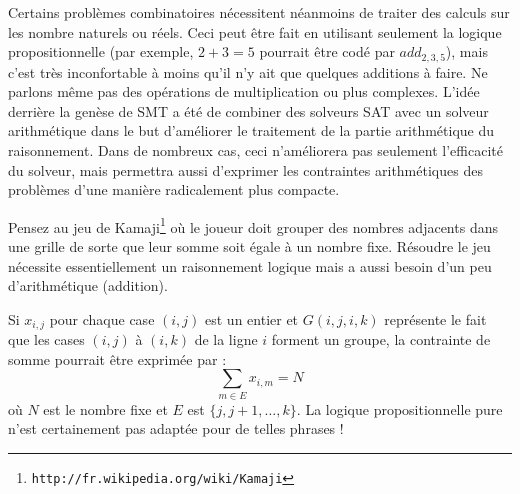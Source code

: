 
Certains problèmes combinatoires nécessitent néanmoins de traiter des calculs sur les nombre naturels ou réels. Ceci peut être fait en utilisant seulement la logique propositionnelle (par exemple, $2+3=5$ pourrait être codé par $add_{2,3,5}$), mais c'est très inconfortable à moins qu'il n'y ait que quelques additions à faire. Ne parlons même pas des opérations de multiplication ou plus complexes. L'idée derrière la genèse de SMT a été de combiner des solveurs SAT avec un solveur arithmétique dans le but d'améliorer le traitement de la partie arithmétique du raisonnement. Dans de nombreux cas, ceci n'améliorera pas seulement l'efficacité du solveur, mais permettra aussi d'exprimer les contraintes arithmétiques des problèmes d'une manière radicalement plus compacte.

Pensez au jeu de Kamaji\footnote{\texttt{http://fr.wikipedia.org/wiki/Kamaji}}  où le joueur doit grouper des nombres adjacents dans une grille de sorte que leur somme soit égale à un nombre fixe. Résoudre le jeu nécessite essentiellement un raisonnement logique mais a aussi besoin d'un peu d'arithmétique (addition).


Si $x_{i,j}$ pour chaque case $(i,j)$ est un entier et $G(i,j,i,k)$ représente le fait que les cases $(i,j)$ à $(i,k)$ de la ligne $i$ forment un groupe, la contrainte de somme pourrait être exprimée par :
$$\sum_{m\in E}x_{i,m}=N$$
où $N$ est le nombre fixe et $E$ est $\{j,j+1,\ldots,k\}$. La logique propositionnelle pure n'est certainement pas adaptée pour de telles phrases !